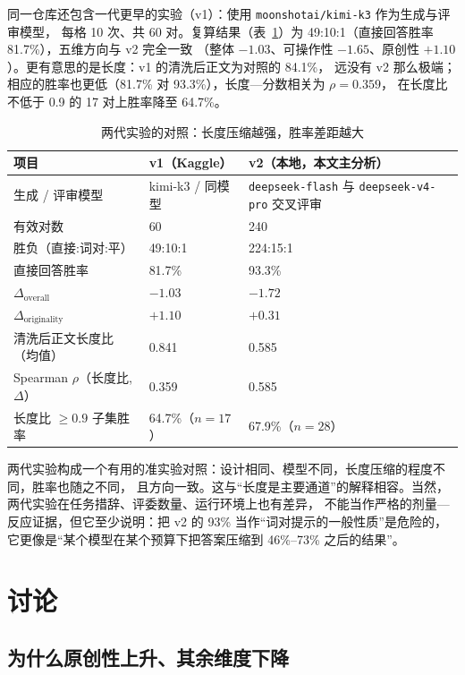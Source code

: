 \documentclass[UTF8,11pt,a4paper]{ctexart}
\newcommand{\deepflash}{\texttt{deepseek-flash}}
\newcommand{\deeppro}{\texttt{deepseek-v4-pro}}
\begin{document}
同一仓库还包含一代更早的实验（v1）：使用 \texttt{moonshotai/kimi-k3} 作为生成与评审模型，
每格 10 次、共 60 对。复算结果（表~\ref{tab:v1v2}）为 49:10:1（直接回答胜率 81.7\%），五维方向与 v2 完全一致
（整体 $-1.03$、可操作性 $-1.65$、原创性 $+1.10$）。更有意思的是长度：v1 的清洗后正文为对照的 84.1\%，
远没有 v2 那么极端；相应的胜率也更低（81.7\% 对 93.3\%），长度—分数相关为 $\rho=0.359$，
在长度比不低于 0.9 的 17 对上胜率降至 64.7\%。

\begin{table}[htbp]
\centering
\caption{两代实验的对照：长度压缩越强，胜率差距越大}\label{tab:v1v2}
\small
\begin{tabular}{@{}lll@{}}
\toprule
项目 & v1（Kaggle） & v2（本地，本文主分析） \\
\midrule
生成 / 评审模型 & kimi-k3 / 同模型 & \deepflash{} 与 \deeppro{} 交叉评审 \\
有效对数 & 60 & 240 \\
胜负（直接:词对:平） & 49:10:1 & 224:15:1 \\
直接回答胜率 & 81.7\% & 93.3\% \\
$\Delta_{\text{overall}}$ & $-1.03$ & $-1.72$ \\
$\Delta_{\text{originality}}$ & $+1.10$ & $+0.31$ \\
清洗后正文长度比（均值） & 0.841 & 0.585 \\
Spearman $\rho$（长度比, $\Delta$） & 0.359 & 0.585 \\
长度比 $\ge0.9$ 子集胜率 & 64.7\%（$n=17$） & 67.9\%（$n=28$） \\
\bottomrule
\end{tabular}
\end{table}

两代实验构成一个有用的准实验对照：设计相同、模型不同，长度压缩的程度不同，胜率也随之不同，
且方向一致。这与“长度是主要通道”的解释相容。当然，两代实验在任务措辞、评委数量、运行环境上也有差异，
不能当作严格的剂量—反应证据，但它至少说明：把 v2 的 93\% 当作“词对提示的一般性质”是危险的，
它更像是“某个模型在某个预算下把答案压缩到 46\%--73\% 之后的结果”。

\section{讨论}

\subsection{为什么原创性上升、其余维度下降}
\end{document}
